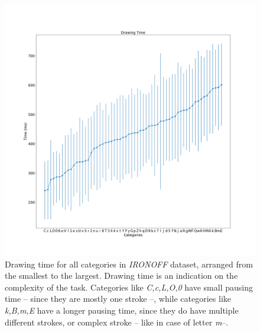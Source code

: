 \begin{figure}
    \centering
    \includegraphics[scale=0.35]{images/dataset/drawing_time.png}
    \caption{Drawing time for all categories in \textit{IRONOFF} dataset, arranged from the smallest to the largest. Drawing time is an indication on the complexity of the task. Categories like \textit{C,c,L,O,0} have small pausing time -- since they are mostly one stroke --, while categories like \textit{k,B,m,E} have a longer pausing time, since they do have multiple different strokes, or complex stroke -- like in case of letter \textit{m}--.}
    \label{fig:ironoff_drawingtime}
\end{figure}

